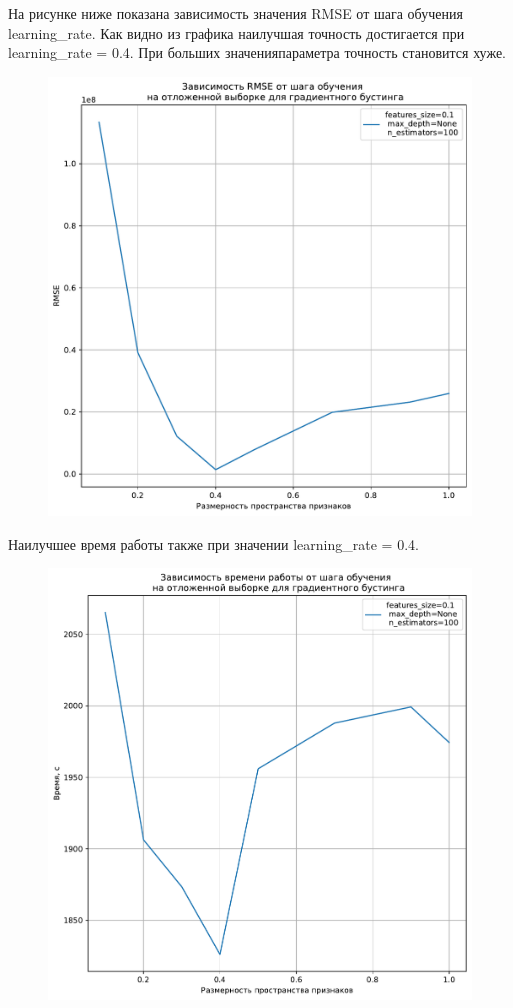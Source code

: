 \documentclass[a4paper, 12pt]{report}
\begin{document}
На рисунке ниже показана зависимость значения RMSE от шага обучения learning\_rate. Как видно из графика наилучшая точность достигается при learning\_rate = 0.4. При больших значенияпараметра точность становится хуже. 


\begin{figure}[H]
        	\centering
        	\includegraphics[width=0.78\linewidth]{ex2_6.pdf}
        	\label{fig:mpr}
        	\vspace{-25pt}
\end{figure}

Наилучшее время работы также при значении learning\_rate = 0.4.

\begin{figure}[H]
        	\centering
        	\includegraphics[width=0.7\linewidth]{ex2_7.pdf}
        	\label{fig:mpr}
        	\vspace{-25pt}
\end{figure}
\end{document}
